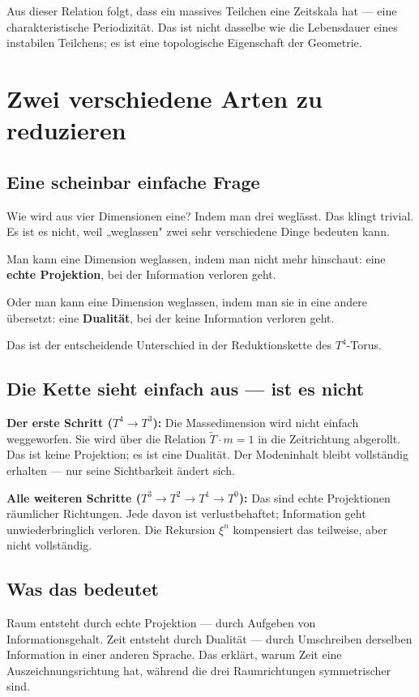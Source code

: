 \documentclass[12pt,oneside]{book}
\begin{document}
Aus dieser Relation folgt, dass ein massives Teilchen eine Zeitskala hat — eine charakteristische Periodizität. Das ist nicht dasselbe wie die Lebensdauer eines instabilen Teilchens; es ist eine topologische Eigenschaft der Geometrie.

\chapter{Zwei verschiedene Arten zu reduzieren}

\section{Eine scheinbar einfache Frage}

Wie wird aus vier Dimensionen eine? Indem man drei weglässt. Das klingt trivial. Es ist es nicht, weil „weglassen" zwei sehr verschiedene Dinge bedeuten kann.

Man kann eine Dimension weglassen, indem man nicht mehr hinschaut: eine \textbf{echte Projektion}, bei der Information verloren geht.

Oder man kann eine Dimension weglassen, indem man sie in eine andere übersetzt: eine \textbf{Dualität}, bei der keine Information verloren geht.

Das ist der entscheidende Unterschied in der Reduktionskette des $T^4$-Torus.

\section{Die Kette sieht einfach aus — ist es nicht}

\textbf{Der erste Schritt ($T^4 \to T^3$):} Die Massedimension wird nicht einfach weggeworfen. Sie wird über die Relation $\tilde{T} \cdot m = 1$ in die Zeitrichtung abgerollt. Das ist keine Projektion; es ist eine Dualität. Der Modeninhalt bleibt vollständig erhalten — nur seine Sichtbarkeit ändert sich.

\textbf{Alle weiteren Schritte ($T^3 \to T^2 \to T^1 \to T^0$):} Das sind echte Projektionen räumlicher Richtungen. Jede davon ist verlustbehaftet; Information geht unwiederbringlich verloren. Die Rekursion $\xi^n$ kompensiert das teilweise, aber nicht vollständig.

\section{Was das bedeutet}

Raum entsteht durch echte Projektion — durch Aufgeben von Informationsgehalt. Zeit entsteht durch Dualität — durch Umschreiben derselben Information in einer anderen Sprache. Das erklärt, warum Zeit eine Auszeichnungsrichtung hat, während die drei Raumrichtungen symmetrischer sind.
\end{document}
